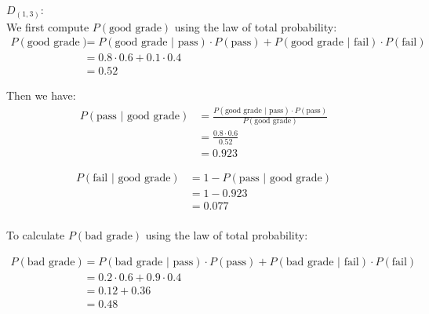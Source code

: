 \documentclass{article}
\begin{document}
\begin{enumerate}
\begin{enumerate}
        $D_{(1,3)}$:\\
        
        We first compute $P(\text{good grade})$ using the law of total probability:
        \begin{equation}
            \begin{split}
                P(\text{good grade}) &= P(\text{good grade } | \text{ pass}) \cdot P(\text{pass}) + P(\text{good grade } | \text{ fail}) \cdot P(\text{fail})\\
                &= 0.8 \cdot 0.6 + 0.1 \cdot 0.4\\
                &= 0.52
            \end{split}
        \end{equation}
            
        Then we have:
         \begin{equation}
             \begin{split}
                P(\text{pass $|$ good grade}) &= \frac{P(\text{good grade $|$ pass})\cdot P(\text{pass})}{P(\text{good grade})}\\
                &= \frac{0.8 \cdot 0.6}{0.52}\\
                &= 0.923
             \end{split}
        \end{equation}

        \begin{equation}
            \begin{split}
                P(\text{fail $|$ good grade}) &= 1 - P(\text{pass $|$ good grade})\\
                &= 1 - 0.923\\
                &= 0.077 \\  
            \end{split}
        \end{equation}
        
        To calculate $P(\text{bad grade})$ using the law of total probability:

        \begin{equation}
            \begin{split}
                P(\text{bad grade}) &= P(\text{bad grade } | \text{ pass}) \cdot P(\text{pass}) + P(\text{bad grade } | \text{ fail}) \cdot P(\text{fail})\\
                &= 0.2 \cdot 0.6 + 0.9 \cdot 0.4\\
                &= 0.12 + 0.36\\
                &= 0.48
            \end{split}
        \end{equation}


\end{enumerate}
\end{enumerate}
\end{document}

